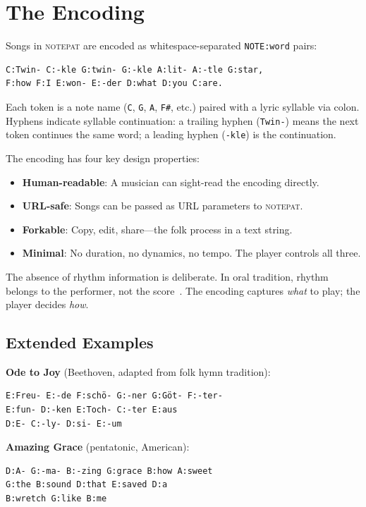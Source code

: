 \documentclass[10pt,letterpaper,twocolumn]{article}
\newcommand{\np}{\textsc{notepat}}
\begin{document}
\section{The Encoding}

Songs in \np{} are encoded as whitespace-separated \texttt{NOTE:word} pairs:

\begin{lstlisting}[style=notepat]
C:Twin- C:-kle G:twin- G:-kle A:lit- A:-tle G:star,
F:how F:I E:won- E:-der D:what D:you C:are.
\end{lstlisting}

Each token is a note name (\texttt{C}, \texttt{G}, \texttt{A}, \texttt{F\#}, etc.) paired with a lyric syllable via colon. Hyphens indicate syllable continuation: a trailing hyphen (\texttt{Twin-}) means the next token continues the same word; a leading hyphen (\texttt{-kle}) is the continuation.

The encoding has four key design properties:

\begin{itemize}
  \item \textbf{Human-readable}: A musician can sight-read the encoding directly.
  \item \textbf{URL-safe}: Songs can be passed as URL parameters to \np{}.
  \item \textbf{Forkable}: Copy, edit, share---the folk process in a text string.
  \item \textbf{Minimal}: No duration, no dynamics, no tempo. The player controls all three.
\end{itemize}

The absence of rhythm information is deliberate. In oral tradition, rhythm belongs to the performer, not the score~\citep{lomax1968folk}. The encoding captures \emph{what} to play; the player decides \emph{how}.

\subsection{Extended Examples}

\textbf{Ode to Joy} (Beethoven, adapted from folk hymn tradition):
\begin{lstlisting}[style=notepat]
E:Freu- E:-de F:schö- G:-ner G:Göt- F:-ter-
E:fun- D:-ken E:Toch- C:-ter E:aus
D:E- C:-ly- D:si- E:-um
\end{lstlisting}

\textbf{Amazing Grace} (pentatonic, American):
\begin{lstlisting}[style=notepat]
D:A- G:-ma- B:-zing G:grace B:how A:sweet
G:the B:sound D:that E:saved D:a
B:wretch G:like B:me
\end{lstlisting}
\end{document}
